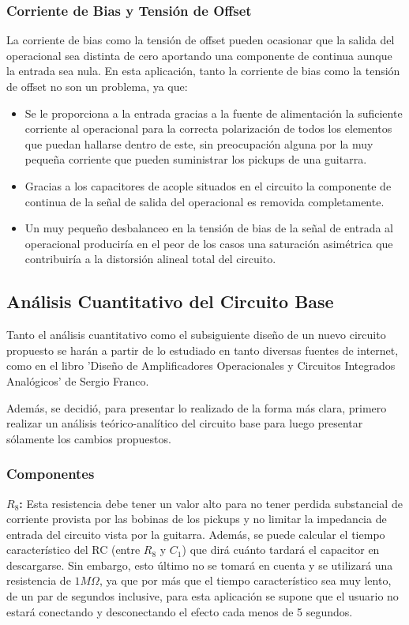 \subsubsection{Corriente de Bias y Tensión de Offset}
La corriente de bias como la tensión de offset pueden ocasionar que la salida del operacional sea distinta de cero aportando una componente de continua aunque la entrada sea nula. En esta aplicación, tanto la corriente de bias como la tensión de offset no son un problema, ya que:
\begin{itemize}
\item Se le proporciona a la entrada gracias a la fuente de alimentación la suficiente corriente al operacional para la correcta polarización de todos los elementos que puedan hallarse dentro de este, sin preocupación alguna por la muy pequeña corriente que pueden suministrar los pickups de una guitarra.
\item Gracias a los capacitores de acople situados en el circuito la componente de continua de la señal de salida del operacional es removida completamente.
\item Un muy pequeño desbalanceo en la tensión de bias de la señal de entrada al operacional produciría en el peor de los casos una saturación asimétrica que contribuiría a la distorsión alineal total del circuito.
\end{itemize} 

\subsection{Análisis Cuantitativo del Circuito Base}

Tanto el análisis cuantitativo como el subsiguiente diseño de un nuevo circuito propuesto se harán a partir de lo estudiado en tanto diversas fuentes de internet, como en el libro 'Diseño de Amplificadores Operacionales y Circuitos Integrados Analógicos' de Sergio Franco.

Además, se decidió, para presentar lo realizado de la forma más clara, primero realizar un análisis teórico-analítico del circuito base para luego presentar sólamente los cambios propuestos.

\subsubsection{Componentes}

\textbf{$R_8$:}
Esta resistencia debe tener un valor alto para no tener perdida substancial de corriente provista por las bobinas de los pickups y no limitar la impedancia de entrada del circuito vista por la guitarra. Además, se puede calcular el tiempo característico del RC (entre $R_8$ y $C_1$) que dirá cuánto tardará el capacitor en descargarse. Sin embargo, esto último no se tomará en cuenta y se utilizará una resistencia de $1M\Omega$, ya que por más que el tiempo característico sea muy lento, de un par de segundos inclusive, para esta aplicación se supone que el usuario no estará conectando y desconectando el efecto cada menos de 5 segundos. \\

